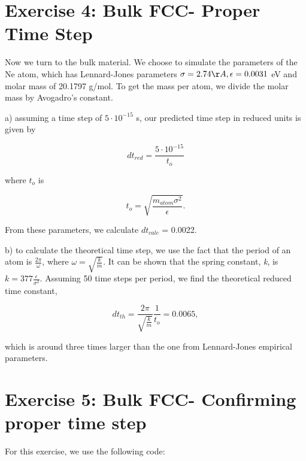 \documentclass[12pt, oneside]{article}
\begin{document}
\section{Exercise 4: Bulk FCC- Proper Time Step}

Now we turn to the bulk material. We choose to simulate the parameters of the Ne atom, which has Lennard-Jones parameters $\sigma = 2.74  \AA, \epsilon = 0.0031$ eV and molar mass of 20.1797 g/mol. To get the mass per atom, we divide the molar mass by Avogadro's constant.

a) assuming a time step of $ 5 \cdot 10^{-15}$ s, our predicted time step in reduced units is given by
 
 \begin{equation}
 	dt_{red} = \frac{5 \cdot 10^{-15}}{t_{o}}
 \end{equation}
 
 \noindent where $t_{o}$ is
 
 \begin{equation}
 	t_o = \sqrt{\frac{m_{atom}\sigma^2}{\epsilon}}.
 \end{equation}
 
 From these parameters, we calculate $dt_{calc}$ = 0.0022.
 
 \vspace{5mm}
 b) to calculate the theoretical time step, we use the fact that the period of an atom is $\frac{2\pi}{\omega}$, where $\omega = \sqrt{\frac{k}{m}} $. It can be shown that the spring constant, \textit{k}, is $k = 377\frac{\epsilon}{\sigma^2}$. Assuming 50 time steps per period, we find the theoretical reduced time constant, 
 
\begin{equation}
	dt_{th} = \frac{2\pi}{\sqrt{\frac{k}{m}}}\frac{1}{t_o} = 0.0065,
\end{equation}
 
\noindent which is around three times larger than the one from Lennard-Jones empirical parameters.

\section{Exercise 5: Bulk FCC- Confirming proper time step}

For this exercise, we use the following code:
\end{document}
